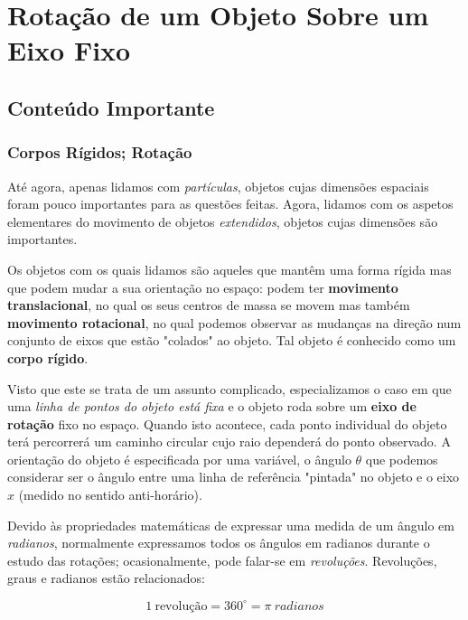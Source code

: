 \section{Rotação de um Objeto Sobre um Eixo Fixo}
\subsection{Conteúdo Importante}
\subsubsection{Corpos Rígidos; Rotação}

Até agora, apenas lidamos com \emph{partículas}, objetos cujas dimensões espaciais foram pouco importantes para as questões feitas. Agora, lidamos com os aspetos elementares do movimento de objetos \emph{extendidos}, objetos cujas dimensões são importantes.

Os objetos com os quais lidamos são aqueles que mantêm uma forma rígida mas que podem mudar a sua orientação no espaço: podem ter \textbf{movimento translacional}, no qual os seus centros de massa se movem mas também \textbf{movimento rotacional}, no qual podemos observar as mudanças na direção num conjunto de eixos que estão "colados" ao objeto. Tal objeto é conhecido como um \textbf{corpo rígido}.

Visto que este se trata de um assunto complicado, especializamos o caso em que uma \emph{linha de pontos do objeto está fixa} e o objeto roda sobre um \textbf{eixo de rotação} fixo no espaço. Quando isto acontece, cada ponto individual do objeto terá percorrerá um caminho circular cujo raio dependerá do ponto observado. A orientação do objeto é especificada por uma variável, o ângulo $\theta$ que podemos considerar ser o ângulo entre uma linha de referência "pintada" no objeto e o eixo $x$ (medido no sentido anti-horário).

Devido às propriedades matemáticas de expressar uma medida de um ângulo em \emph{radianos}, normalmente expressamos todos os ângulos em radianos durante o estudo das rotações; ocasionalmente, pode falar-se em \emph{revoluções}. Revoluções, graus e radianos estão relacionados:

\begin{equation*}
    1\ \text{revolução}=360^{\circ}=\pi\ radianos
\end{equation*}

